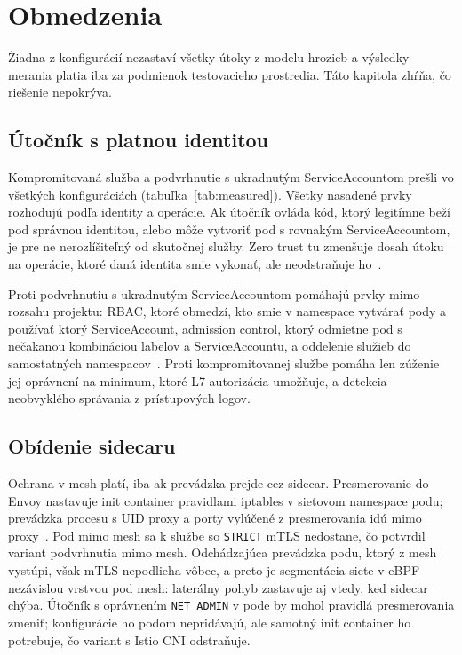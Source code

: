 \chapter{Obmedzenia}
\label{ch:limits}

Žiadna z konfigurácií nezastaví všetky útoky z modelu hrozieb a výsledky merania platia iba za podmienok testovacieho prostredia. Táto kapitola zhŕňa, čo riešenie nepokrýva.

\section{Útočník s platnou identitou}

Kompromitovaná služba a podvrhnutie s ukradnutým ServiceAccountom prešli vo všetkých konfiguráciách (tabuľka~\ref{tab:measured}). Všetky nasadené prvky rozhodujú podľa identity a operácie. Ak útočník ovláda kód, ktorý legitímne beží pod správnou identitou, alebo môže vytvoriť pod s rovnakým ServiceAccountom, je pre ne nerozlíšiteľný od skutočnej služby. Zero trust tu zmenšuje dosah útoku na operácie, ktoré daná identita smie vykonať, ale neodstraňuje ho~\cite{nist-sp800-207}.

Proti podvrhnutiu s ukradnutým ServiceAccountom pomáhajú prvky mimo rozsahu projektu: RBAC, ktoré obmedzí, kto smie v namespace vytvárať pody a používať ktorý ServiceAccount, admission control, ktorý odmietne pod s nečakanou kombináciou labelov a ServiceAccountu, a oddelenie služieb do samostatných namespacov~\cite{k8s-rbac}. Proti kompromitovanej službe pomáha len zúženie jej oprávnení na minimum, ktoré L7 autorizácia umožňuje, a detekcia neobvyklého správania z prístupových logov.

\section{Obídenie sidecaru}

Ochrana v mesh platí, iba ak prevádzka prejde cez sidecar. Presmerovanie do Envoy nastavuje init container pravidlami iptables v sieťovom namespace podu; prevádzka procesu s UID proxy a porty vylúčené z presmerovania idú mimo proxy~\cite{istio-security}. Pod mimo mesh sa k službe so \texttt{STRICT} mTLS nedostane, čo potvrdil variant podvrhnutia mimo mesh. Odchádzajúca prevádzka podu, ktorý z mesh vystúpi, však mTLS nepodlieha vôbec, a preto je segmentácia siete v eBPF nezávislou vrstvou pod mesh: laterálny pohyb zastavuje aj vtedy, keď sidecar chýba. Útočník s oprávnením \texttt{NET\_ADMIN} v pode by mohol pravidlá presmerovania zmeniť; konfigurácie ho podom nepridávajú, ale samotný init container ho potrebuje, čo variant s Istio CNI odstraňuje.

